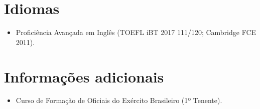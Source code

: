 \documentclass{tccv}
\begin{document}
\section{Idiomas}
    
    \begin{itemize}
        \item Proficiência Avançada em Inglês (TOEFL iBT 2017 111/120; Cambridge FCE 2011).
    \end{itemize}

\section{Informações adicionais}
    
    \begin{itemize}
        \item Curso de Formação de Oficiais do Exército Brasileiro (1º Tenente).
    \end{itemize}
    
\end{document}
